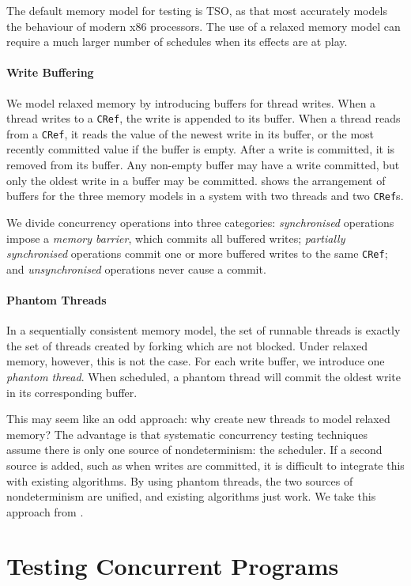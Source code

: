 The default memory model for testing is TSO, as that most accurately models the
behaviour of modern x86 processors\cite{owens2009}.  The use of a relaxed memory
model can require a much larger number of schedules when its effects are at
play.

\paragraph{Write Buffering}
We model relaxed memory by introducing buffers for thread writes.  When a thread
writes to a \verb|CRef|, the write is appended to its buffer.  When a thread
reads from a \verb|CRef|, it reads the value of the newest write in its buffer,
or the most recently committed value if the buffer is empty.  After a write is
committed, it is removed from its buffer.  Any non-empty buffer may have a write
committed, but only the oldest write in a buffer may be committed.  
shows the arrangement of buffers for the three memory models in a system with
two threads and two \verb|CRef|s.

We divide concurrency operations into three categories: \emph{synchronised}
operations impose a \emph{memory barrier}, which commits all buffered writes;
\emph{partially synchronised} operations commit one or more buffered writes to
the same \verb|CRef|; and \emph{unsynchronised} operations never cause a commit.

\paragraph{Phantom Threads}
In a sequentially consistent memory model, the set of runnable threads is
exactly the set of threads created by forking which are not blocked.  Under
relaxed memory, however, this is not the case.  For each write buffer, we
introduce one \emph{phantom thread}.  When scheduled, a phantom thread will
commit the oldest write in its corresponding buffer.

This may seem like an odd approach: why create new threads to model relaxed
memory?  The advantage is that systematic concurrency testing techniques assume
there is only one source of nondeterminism: the scheduler.  If a second source
is added, such as when writes are committed, it is difficult to integrate this
with existing algorithms.  By using phantom threads, the two sources of
nondeterminism are unified, and existing algorithms just work.  We take this
approach from \cite{zhang2015}.

\section{Testing Concurrent Programs}
\label{sec:dejafu-testing}

